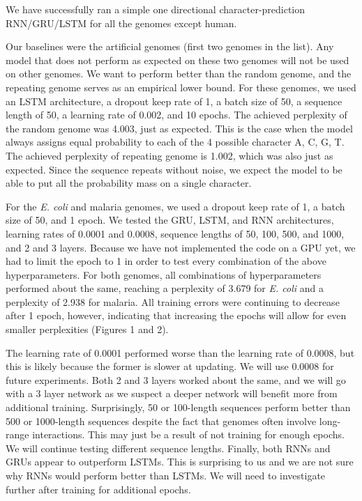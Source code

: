\documentclass{article} %
\begin{document}
We have successfully ran a simple one directional character-prediction RNN/GRU/LSTM for all the genomes except human. 

Our baselines were the artificial genomes (first two genomes in the list). Any model that does not perform as expected on these two genomes will not be used on other genomes. We want to perform better than the random genome, and the repeating genome serves as an empirical lower bound. For these genomes, we used an LSTM architecture, a dropout keep rate of 1, a batch size of 50, a sequence length of 50, a learning rate of 0.002, and 10 epochs. The achieved perplexity of the random genome was 4.003, just as expected. This is the case when the model always assigns equal probability to each of the 4 possible character A, C, G, T. The achieved perplexity of repeating genome is 1.002, which was also just as expected. Since the sequence repeats without noise, we expect the model to be able to put all the probability mass on a single character.

For the \textit{E. coli} and malaria genomes, we used a dropout keep rate of 1, a batch size of 50, and 1 epoch. We tested the GRU, LSTM, and RNN architectures, learning rates of 0.0001 and 0.0008, sequence lengths of 50, 100, 500, and 1000, and 2 and 3 layers. Because we have not implemented the code on a GPU yet, we had to limit the epoch to 1 in order to test every combination of the above hyperparameters. For both genomes, all combinations of hyperparameters performed about the same, reaching a perplexity of 3.679 for \textit{E. coli} and a perplexity of 2.938 for malaria. All training errors were continuing to decrease after 1 epoch, however, indicating that increasing the epochs will allow for even smaller perplexities (Figures 1 and 2).

The learning rate of 0.0001 performed worse than the learning rate of 0.0008, but this is likely because the former is slower at updating. We will use 0.0008 for future experiments. Both 2 and 3 layers worked about the same, and we will go with a 3 layer network as we suspect a deeper network will benefit more from additional training. Surprisingly, 50 or 100-length sequences perform better than 500 or 1000-length sequences despite the fact that genomes often involve long-range interactions. This may just be a result of not training for enough epochs. We will continue testing different sequence lengths. Finally, both RNNs and GRUs appear to outperform LSTMs. This is surprising to us and we are not sure why RNNs would perform better than LSTMs. We will need to investigate further after training for additional epochs.
\end{document}
